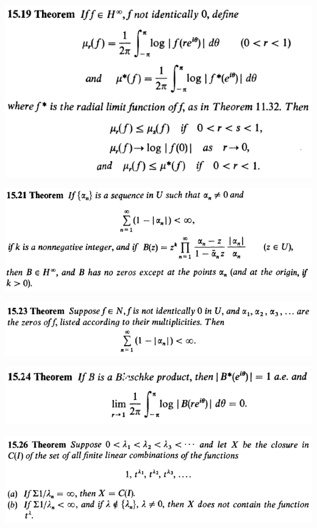 \documentclass[12pt]{article}
\begin{document}
		\begin{center}
		\includegraphics{15ponto19}
		\end{center}

		\begin{center}
		\includegraphics{15ponto21}
		\end{center}

		\begin{center}
		\includegraphics{15ponto23}
		\end{center}

		\begin{center}
		\includegraphics{15ponto24}
		\end{center}

		\begin{center}
		\includegraphics{15ponto26}
		\end{center}
\end{document}
